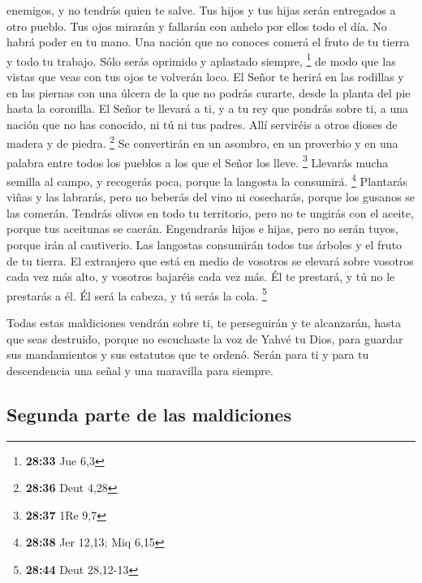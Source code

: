 enemigos, y no tendrás quien te salve.  Tus hijos y tus
hijas serán entregados a otro pueblo. Tus ojos mirarán y fallarán con
anhelo por ellos todo el día. No habrá poder en tu mano. 
Una nación que no conoces comerá el fruto de tu tierra y todo tu
trabajo. Sólo serás oprimido y aplastado siempre, \footnote{\textbf{28:33}
  Jue 6,3}  de modo que las vistas que veas con tus ojos
te volverán loco.  El Señor te herirá en las rodillas y
en las piernas con una úlcera de la que no podrás curarte, desde la
planta del pie hasta la coronilla.  El Señor te llevará a
ti, y a tu rey que pondrás sobre ti, a una nación que no has conocido,
ni tú ni tus padres. Allí serviréis a otros dioses de madera y de
piedra. \footnote{\textbf{28:36} Deut 4,28}  Se
convertirán en un asombro, en un proverbio y en una palabra entre todos
los pueblos a los que el Señor los lleve. \footnote{\textbf{28:37} 1Re
  9,7}  Llevarás mucha semilla al campo, y recogerás
poca, porque la langosta la consumirá. \footnote{\textbf{28:38} Jer
  12,13; Miq 6,15}  Plantarás viñas y las labrarás, pero
no beberás del vino ni cosecharás, porque los gusanos se las comerán.
 Tendrás olivos en todo tu territorio, pero no te ungirás
con el aceite, porque tus aceitunas se caerán. 
Engendrarás hijos e hijas, pero no serán tuyos, porque irán al
cautiverio.  Las langostas consumirán todos tus árboles y
el fruto de tu tierra.  El extranjero que está en medio
de vosotros se elevará sobre vosotros cada vez más alto, y vosotros
bajaréis cada vez más.  Él te prestará, y tú no le
prestarás a él. Él será la cabeza, y tú serás la cola. \footnote{\textbf{28:44}
  Deut 28,12-13}

 Todas estas maldiciones vendrán sobre ti, te perseguirán
y te alcanzarán, hasta que seas destruido, porque no escuchaste la voz
de Yahvé tu Dios, para guardar sus mandamientos y sus estatutos que te
ordenó.  Serán para ti y para tu descendencia una señal y
una maravilla para siempre.

\hypertarget{segunda-parte-de-las-maldiciones}{%
\subsection{Segunda parte de las
maldiciones}\label{segunda-parte-de-las-maldiciones}}

